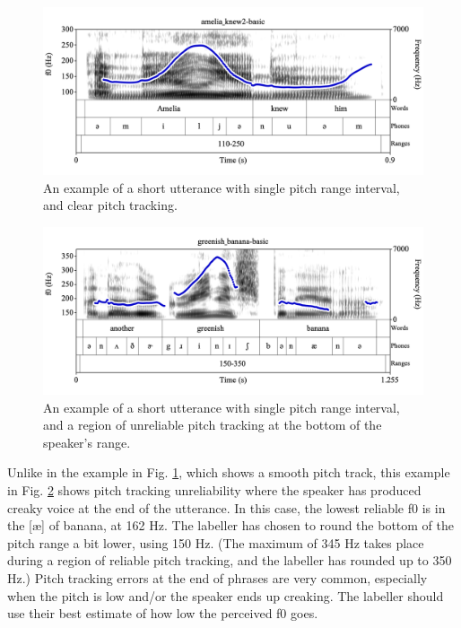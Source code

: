 \documentclass[11pt, twoside]{memoir}
\begin{document}
\begin{figure}[H]
\centering
\includegraphics[width=.875\linewidth]{Ranges-amelia_knew2-basic.png}
\caption{An example of a short utterance with single pitch range interval, and clear pitch tracking.
\label{fig:amelia-knew2 Ranges basic}
}
\end{figure}
\begin{figure}[H]
\centering
\includegraphics[width=.875\linewidth]{Ranges-greenish_banana-basic.png}
\caption[An example of a short utterance with single pitch range interval.]{An example of a short utterance with single pitch range interval, and a region of unreliable pitch tracking at the bottom of the speaker’s range.
\label{fig:greenish-banana Ranges basic}
}
\end{figure}
Unlike in the example in Fig. \ref{fig:amelia-knew2 Ranges basic}, which shows a smooth pitch track, this example in Fig. \ref{fig:greenish-banana Ranges basic} shows pitch tracking unreliability where the speaker has produced creaky voice at the end of the utterance. In this case, the lowest reliable f0 is in the [æ] of banana, at 162 Hz. The labeller has chosen to round the bottom of the pitch range a bit lower, using 150 Hz. (The maximum of 345 Hz takes place during a region of reliable pitch tracking, and the labeller has rounded up to 350 Hz.) Pitch tracking errors at the end of phrases are very common, especially when the pitch is low and/or the speaker ends up creaking. The labeller should use their best estimate of how low the perceived f0 goes. 
\end{document}
